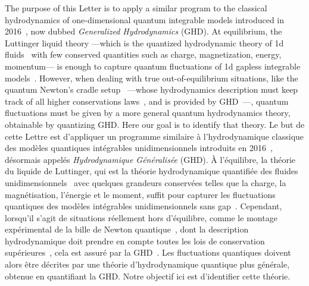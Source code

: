 \documentclass[twocolumn,amsfonts,showpacs,superscriptaddress]{revtex4-1}
\newcommand{\trad}[1]{\textcolor{myblue}{#1}}
\begin{document}
The purpose of this Letter is to apply a similar program to the classical hydrodynamics of one-dimensional quantum integrable models introduced in 2016~\cite{bertini2016transport,castro2016emergent}, now dubbed {\it Generalized Hydrodynamics} (GHD). At equilibrium, the Luttinger
liquid theory ---which is the quantized hydrodynamic theory
of 1d fluids~\cite{abanov2006hydrodynamics} with few conserved quantities such
as charge, magnetization, energy, momentum--- is enough to capture
quantum fluctuations of 1d gapless integrable models~\cite{haldane1981luttinger,giamarchi2003quantum,cazalilla2004bosonizing}. However,
when dealing with true out-of-equilibrium situations, like the quantum Newton's cradle setup~\cite{kinoshita2006quantum} ---whose hydrodynamics description must keep track of all higher conservations laws~\cite{rigol2007relaxation}, and is provided by GHD~\cite{caux2019hydrodynamics}---, quantum fluctuations must be given by a more general quantum hydrodynamics theory, obtainable by quantizing GHD.
Here our goal is to identify that theory.
\trad{Le but de cette Lettre est d'appliquer un programme similaire à l'hydrodynamique classique des modèles quantiques intégrables unidimensionnels introduits en 2016~\cite{bertini2016transport,castro2016emergent}, désormais appelés {\it Hydrodynamique Généralisée} (GHD). À l'équilibre, la théorie du liquide de Luttinger, qui est la théorie hydrodynamique quantifiée des fluides unidimensionnels~\cite{abanov2006hydrodynamics} avec quelques grandeurs conservées telles que la charge, la magnétisation, l'énergie et le moment, suffit pour capturer les fluctuations quantiques des modèles intégrables unidimensionnels sans gap~\cite{haldane1981luttinger,giamarchi2003quantum,cazalilla2004bosonizing}. Cependant, lorsqu'il s'agit de situations réellement hors d'équilibre, comme le montage expérimental de la bille de Newton quantique~\cite{kinoshita2006quantum}, dont la description hydrodynamique doit prendre en compte toutes les lois de conservation supérieures~\cite{rigol2007relaxation}, cela est assuré par la GHD~\cite{caux2019hydrodynamics}. Les fluctuations quantiques doivent alors être décrites par une théorie d'hydrodynamique quantique plus générale, obtenue en quantifiant la GHD. Notre objectif ici est d'identifier cette théorie.}
\end{document}
